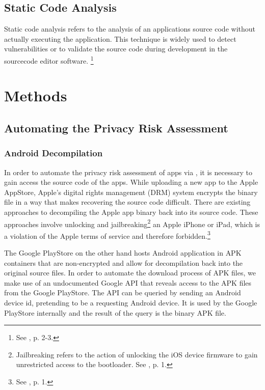 \documentclass[
	a4paper,
	oneside,
	12pt,
	liststotocnumbered
]{article}
\let\cite\textcite
\begin{document}
\subsection{Static Code Analysis}

Static code analysis refers to the analysis of an applications source code without actually executing the application. 
This technique is widely used to detect vulnerabilities or to validate the source code during development in the sourcecode editor software. \footnote{See \cite{Bardas2010}, p. 2-3.}

\section{Methods}

\subsection{Automating the Privacy Risk Assessment}

\subsubsection{Android Decompilation}

In order to automate the privacy risk assessment of \mH apps via \sca, it is necessary to gain access the source code of the apps. 
While uploading a new app to the Apple AppStore, Apple's digital rights management (\acs{DRM}) system encrypts the binary file in a way that makes recovering the source code difficult. 
There are existing approaches to decompiling the Apple app binary back into its source code.
These approaches involve unlocking and jailbreaking\footnote{Jailbreaking refers to the action of unlocking the iOS device firmware to gain unrestricted access to the bootloader. See \cite{Kweller2010}, p. 1.}
an Apple iPhone or iPad, which is a violation of the Apple terms of service and therefore forbidden.\footnote{See \cite{Kweller2010}, p. 1.}

The Google PlayStore on the other hand hosts Android application in \acs{APK} containers that are non-encrypted and allow for decompilation back into the original source files. 
In order to automate the download process of \acs{APK} files, we make use of an undocumented Google \acs{API} that reveals access to the \acs{APK} files from the Google PlayStore. 
The \acs{API} can be queried by sending an Android device id, pretending to be a requesting Android device. It is used by the Google PlayStore internally and the result of the query is the binary \acs{APK} file.
\end{document}
